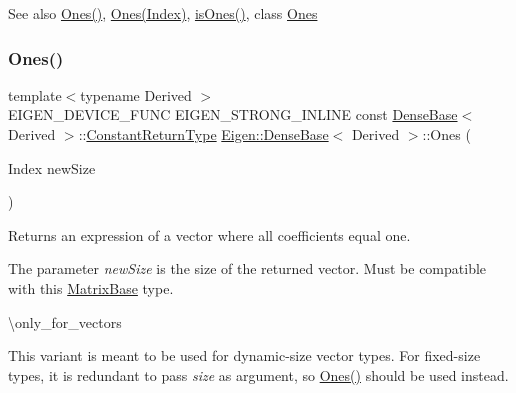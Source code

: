 \begin{DoxySeeAlso}{See also}
\mbox{\hyperlink{class_eigen_1_1_dense_base_a1284a38971d817c33e40c226f6347e37}{Ones()}}, \mbox{\hyperlink{class_eigen_1_1_dense_base_aef6ca489dc447631fe874c8071ee7edd}{Ones(\+Index)}}, \mbox{\hyperlink{class_eigen_1_1_dense_base_a91fb1c80e1fd4970a16fd509764225d7}{is\+Ones()}}, class \mbox{\hyperlink{class_eigen_1_1_dense_base_adb1ce2c904a1eb3f3bab81ced1b916b6}{Ones}} 
\end{DoxySeeAlso}
\mbox{\label{class_eigen_1_1_dense_base_aef6ca489dc447631fe874c8071ee7edd}} 
\subsubsection{\texorpdfstring{Ones()}{Ones()}\hspace{0.1cm}{\footnotesize\ttfamily [2/3]}}
{\footnotesize\ttfamily template$<$typename Derived $>$ \\
E\+I\+G\+E\+N\+\_\+\+D\+E\+V\+I\+C\+E\+\_\+\+F\+U\+NC E\+I\+G\+E\+N\+\_\+\+S\+T\+R\+O\+N\+G\+\_\+\+I\+N\+L\+I\+NE const \mbox{\hyperlink{class_eigen_1_1_dense_base}{Dense\+Base}}$<$ Derived $>$\+::\mbox{\hyperlink{class_eigen_1_1_cwise_nullary_op}{Constant\+Return\+Type}} \mbox{\hyperlink{class_eigen_1_1_dense_base}{Eigen\+::\+Dense\+Base}}$<$ Derived $>$\+::Ones (\begin{DoxyParamCaption}\item[{Index}]{new\+Size }\end{DoxyParamCaption})\hspace{0.3cm}{\ttfamily [static]}}

\begin{DoxyReturn}{Returns}
an expression of a vector where all coefficients equal one.
\end{DoxyReturn}
The parameter {\itshape new\+Size} is the size of the returned vector. Must be compatible with this \mbox{\hyperlink{class_eigen_1_1_matrix_base}{Matrix\+Base}} type.

\textbackslash{}only\+\_\+for\+\_\+vectors

This variant is meant to be used for dynamic-\/size vector types. For fixed-\/size types, it is redundant to pass {\itshape size} as argument, so \mbox{\hyperlink{class_eigen_1_1_dense_base_a1284a38971d817c33e40c226f6347e37}{Ones()}} should be used instead.

